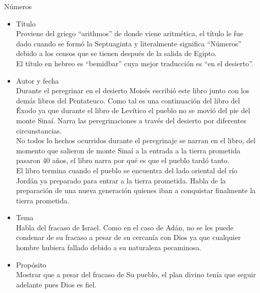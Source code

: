 %

%
\begin{section}{Números}
	\begin{itemize}

		\item Título\\
Proviene del griego ``arithmos'' de donde viene aritmética, el título le fue dado cuando se formó la Septuaginta y literalmente significa ``Números'' debido a los censos que se tienen después de la salida de Egipto.\\
El título en hebreo es ``bemidbar'' cuya mejor traducción es ``en el desierto''.
		\item Autor y fecha\\
Durante el peregrinar en el desierto Moisés escribió este libro junto con los demás libros del Pentateuco. Como tal es una continuación del libro del Éxodo ya que durante el libro de Levítico el pueblo no se movió del pie del monte Sinaí. Narra las peregrinaciones a través del desierto por diferentes circunstancias.\\
No todos lo hechos ocurridos durante el peregrinaje se narran en el libro, del momento que salieron de monte Sinaí a la entrada a la tierra prometida pasaron 40 años, el libro narra por qué es que el pueblo tardó tanto.\\
El libro termina cuando el pueblo se encuentra del lado oriental del río Jordán ya preparado para entrar a la tierra prometida. Habla de la preparación de una nueva generación quienes iban a conquistar finalmente la tierra prometida.
		\item Tema\\
Habla del fracaso de Israel. Como en el caso de Adán, no se les puede condenar de su fracaso a pesar de su cercanía con Dios ya que cualquier hombre hubiera fallado debido a su naturaleza pecaminosa.\\
		\item Propósito\\
			Mostrar que a pesar del fracaso de Su pueblo, el plan divino tenía que seguir adelante pues Dios es fiel.


\end{itemize}
\end{section}
